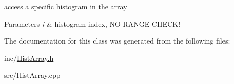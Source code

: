 access a specific histogram in the array 


\begin{DoxyParams}{Parameters}
{\em i} & histogram index, N\-O R\-A\-N\-G\-E C\-H\-E\-C\-K! \\
\hline
\end{DoxyParams}


The documentation for this class was generated from the following files\-:\begin{DoxyCompactItemize}
\item 
inc/\hyperlink{HistArray_8h}{Hist\-Array.\-h}\item 
src/Hist\-Array.\-cpp\end{DoxyCompactItemize}
